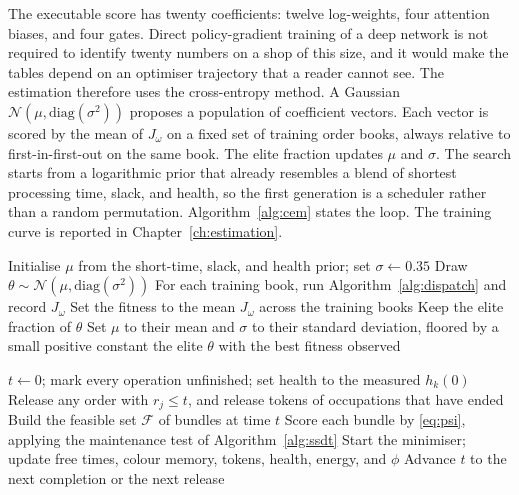 The executable score has twenty coefficients: twelve log-weights, four attention biases, and four gates. Direct policy-gradient training of a deep network is not required to identify twenty numbers on a shop of this size, and it would make the tables depend on an optimiser trajectory that a reader cannot see. The estimation therefore uses the cross-entropy method. A Gaussian \(\mathcal{N}(\mu, \mathrm{diag}(\sigma^2))\) proposes a population of coefficient vectors. Each vector is scored by the mean of \(J_\omega\) on a fixed set of training order books, always relative to first-in-first-out on the same book. The elite fraction updates \(\mu\) and \(\sigma\). The search starts from a logarithmic prior that already resembles a blend of shortest processing time, slack, and health, so the first generation is a scheduler rather than a random permutation. Algorithm~\ref{alg:cem} states the loop. The training curve is reported in Chapter~\ref{ch:estimation}.

\begin{algorithm}[ht]
\caption{Cross-entropy identification of the RCH-GAT score}
\label{alg:cem}
\begin{algorithmic}[1]
\State Initialise \(\mu\) from the short-time, slack, and health prior; set \(\sigma \leftarrow 0.35\)
    \State Draw \(\theta \sim \mathcal{N}(\mu, \mathrm{diag}(\sigma^2))\)
    \State For each training book, run Algorithm~\ref{alg:dispatch} and record \(J_\omega\)
    \State Set the fitness to the mean \(J_\omega\) across the training books
  \EndFor
  \State Keep the elite fraction of \(\theta\)
  \State Set \(\mu\) to their mean and \(\sigma\) to their standard deviation, floored by a small positive constant
\EndFor
\State \Return the elite \(\theta\) with the best fitness observed
\end{algorithmic}
\end{algorithm}

\begin{algorithm}[ht]
\caption{Online dispatch with a masked resource bundle}
\label{alg:dispatch}
\begin{algorithmic}[1]
\State \(t \leftarrow 0\); mark every operation unfinished; set health to the measured \(h_k(0)\)
  \State Release any order with \(r_j \le t\), and release tokens of occupations that have ended
  \State Build the feasible set \(\mathcal{F}\) of bundles at time \(t\)
    \State Score each bundle by \eqref{eq:psi}, applying the maintenance test of Algorithm~\ref{alg:ssdt}
    \State Start the minimiser; update free times, colour memory, tokens, health, energy, and \(\phi\)
  \Else
    \State Advance \(t\) to the next completion or the next release
  \EndIf
\EndWhile
\end{algorithmic}
\end{algorithm}

